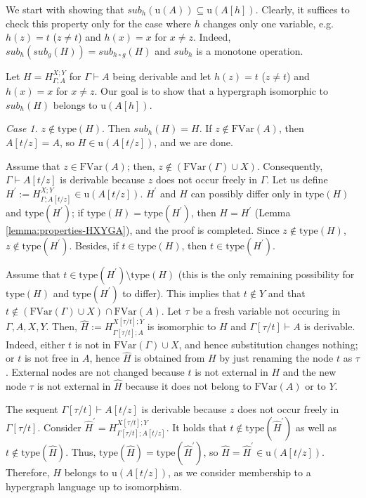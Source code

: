 \documentclass[a4paper,UKenglish,cleveref, autoref, thm-restate,pdfa]{lipics-v2021}
\newcommand{\eqdef}{:=}
\newcommand{\type}{\mathrm{type}}
\newcommand{\FVar}{\mathrm{FVar}}
\newcommand{\sub}{\mathit{sub}}
\begin{document}
We start with showing that $\sub_h(\mathrm{u}(A)) \subseteq \mathrm{u}(A[h])$. Clearly, it suffices to check this property only for the case where $h$ changes only one variable, e.g. $h(z) = t$ ($z \ne t$) and $h(x)=x$ for $x \ne z$. Indeed, $\sub_h(\sub_g(H)) = \sub_{h \circ g}(H)$ and $\sub_h$ is a monotone operation.

Let $H  = H^{X;Y}_{\Gamma; A}$ for $\Gamma \vdash A$ being derivable and let $h(z) = t$ ($z \ne t$) and $h(x)=x$ for $x \ne z$. Our goal is to show that a hypergraph isomorphic to $\sub_h(H)$ belongs to $\mathrm{u}(A[h])$.

\textit{Case 1.} $z \notin \type(H)$. Then $\sub_h(H)=H$. If $z \notin \FVar(A)$, then $A[t/z]=A$, so $H \in \mathrm{u}(A[t/z])$, and we are done. 

Assume that $z \in \FVar(A)$; then, $z \notin (\FVar(\Gamma) \cup X)$. Consequently, $\Gamma \vdash A[t/z]$ is derivable because $z$ does not occur freely in $\Gamma$.
Let us define $H^\prime \eqdef H^{X;Y}_{\Gamma; A[t/z]} \in \mathrm{u}(A[t/z])$. $H^\prime$ and $H$ can possibly differ only in $\type(H)$ and $\type(H^\prime)$; if $\type(H)=\type(H^\prime)$, then $H=H^\prime$ (Lemma \ref{lemma:properties-HXYGA}), and the proof is completed. Since $z \notin \type(H)$, $z \notin \type(H^\prime)$. Besides, if $t \in \type(H)$, then $t \in \type(H^\prime)$. 

Assume that $t \in \type(H^\prime) \setminus \type(H)$ (this is the only remaining possibility for $\type(H)$ and $\type(H^\prime)$ to differ). This implies that $t \notin Y$ and that $t \notin (\FVar(\Gamma) \cup X) \cap \FVar(A)$. Let $\tau$ be a fresh variable not occuring in $\Gamma,A,X,Y$. Then, $\hat{H} \eqdef H^{X[\tau/t];Y}_{\Gamma[\tau/t];A}$ is isomorphic to $H$ and $\Gamma[\tau/t] \vdash A$ is derivable. Indeed, either $t$ is not in $\FVar(\Gamma) \cup X$, and hence substitution changes nothing; or $t$ is not free in $A$, hence $\hat{H}$ is obtained from $H$ by just renaming the node $t$ as $\tau$. External nodes are not changed because $t$ is not external in $H$ and the new node $\tau$ is not external in $\hat{H}$ because it does not belong to $\FVar(A)$ or to $Y$. 

The sequent $\Gamma[\tau/t] \vdash A[t/z]$ is derivable because $z$ does not occur freely in $\Gamma[\tau/t]$. Consider $\hat{H}^\prime = H^{X[\tau/t];Y}_{\Gamma[\tau/t];A[t/z]}$. It holds that $t \notin \type(\hat{H}^\prime)$ as well as $t \notin \type(\hat{H})$. Thus, $\type(\hat{H}) = \type(\hat{H}^\prime)$, so $\hat{H}=\hat{H}^\prime \in \mathrm{u}(A[t/z])$. Therefore, $H$ belongs to $\mathrm{u}(A[t/z])$, as we consider membership to a hypergraph language up to isomorphism.
\end{document}
